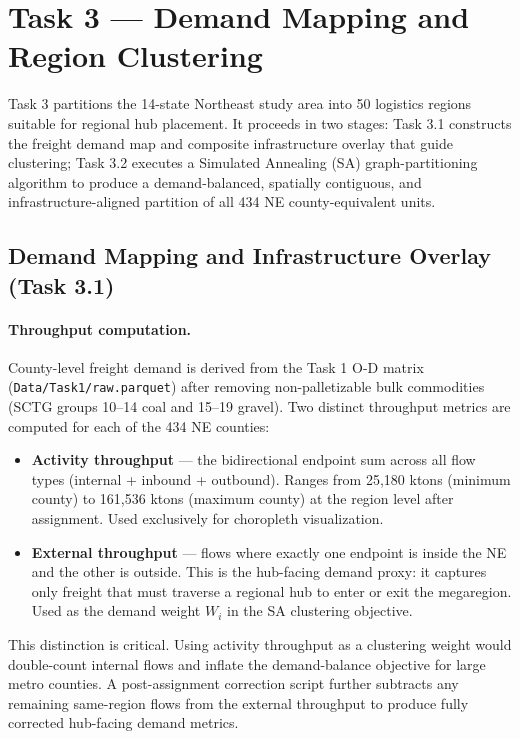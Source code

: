 
\section{Task 3 — Demand Mapping and Region Clustering}

Task 3 partitions the 14-state Northeast study area into 50 logistics regions suitable
for regional hub placement. It proceeds in two stages: Task 3.1 constructs the freight
demand map and composite infrastructure overlay that guide clustering; Task 3.2 executes
a Simulated Annealing (SA) graph-partitioning algorithm to produce a demand-balanced,
spatially contiguous, and infrastructure-aligned partition of all 434 NE county-equivalent
units.

\subsection{Demand Mapping and Infrastructure Overlay (Task 3.1)}

\paragraph{Throughput computation.}
County-level freight demand is derived from the Task 1 O-D matrix
(\texttt{Data/Task1/raw.parquet}) after removing non-palletizable bulk commodities
(SCTG groups 10--14 coal and 15--19 gravel). Two distinct throughput metrics are computed
for each of the 434 NE counties:

\begin{itemize}
  \item \textbf{Activity throughput} — the bidirectional endpoint sum across all flow
        types (internal + inbound + outbound). Ranges from 25{,}180 ktons (minimum county)
        to 161{,}536 ktons (maximum county) at the region level after assignment. Used
        exclusively for choropleth visualization.
  \item \textbf{External throughput} — flows where exactly one endpoint is inside the NE
        and the other is outside. This is the hub-facing demand proxy: it captures only
        freight that must traverse a regional hub to enter or exit the megaregion. Used
        as the demand weight $W_i$ in the SA clustering objective.
\end{itemize}

This distinction is critical. Using activity throughput as a clustering weight would
double-count internal flows and inflate the demand-balance objective for large metro
counties. A post-assignment correction script further subtracts any remaining same-region
flows from the external throughput to produce fully corrected hub-facing demand metrics.


